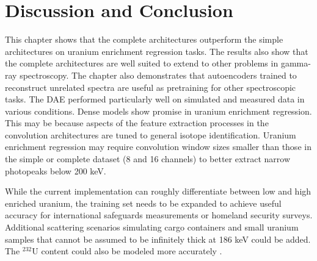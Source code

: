 \section{Discussion and Conclusion}

This chapter shows that the complete architectures outperform the simple architectures on uranium enrichment regression tasks. The results also show that the complete architectures are well suited to extend to other problems in gamma-ray spectroscopy. The chapter also demonstrates that autoencoders trained to reconstruct unrelated spectra are useful as pretraining for other spectroscopic tasks. The DAE performed particularly well on simulated and measured data in various conditions. Dense models show promise in uranium enrichment regression. This may be because aspects of the feature extraction processes in the convolution architectures are tuned to general isotope identification. Uranium enrichment regression may require convolution window sizes smaller than those in the simple or complete dataset (8 and 16 channels) to better extract narrow photopeaks below 200 keV. 

While the current implementation can roughly differentiate between low and high enriched uranium, the training set needs to be expanded to achieve useful accuracy for international safeguards measurements or homeland security surveys. Additional scattering scenarios simulating cargo containers and small uranium samples that cannot be assumed to be infinitely thick at 186 keV could be added. The $^{232}$U content could also be modeled more accurately \cite{Peurrung2019}.







